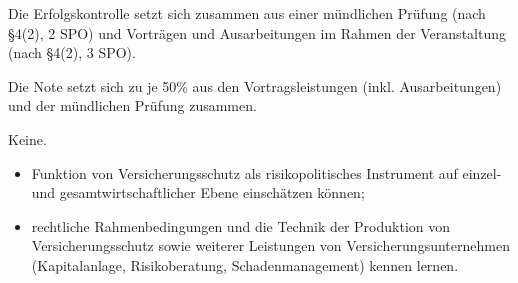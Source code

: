 \begin{course}

\setdoclanguagegerman
{}



\coursehead


\label{cour_6993.dp_997}


\begin{styleenv}
\begin{assessment}
Die Erfolgskontrolle setzt sich zusammen aus einer mündlichen Prüfung (nach §4(2), 2 SPO) und Vorträgen und Ausarbeitungen im Rahmen der Veranstaltung (nach §4(2), 3 SPO).

 

Die Note setzt sich zu je 50\% aus den Vortragsleistungen (inkl. Ausarbeitungen) und der mündlichen Prüfung zusammen.


\end{assessment}

\begin{conditions}Keine.\end{conditions}


\end{styleenv}

\begin{learningoutcomes}
\begin{itemize}\item Funktion von Versicherungsschutz als risikopolitisches Instrument auf einzel- und gesamtwirtschaftlicher Ebene einschätzen können;  \item rechtliche Rahmenbedingungen und die Technik der Produktion von Versicherungsschutz sowie weiterer Leistungen von Versicherungsunternehmen (Kapitalanlage, Risikoberatung, Schadenmanagement) kennen lernen.  \end{itemize}
\end{learningoutcomes}


\end{course}
